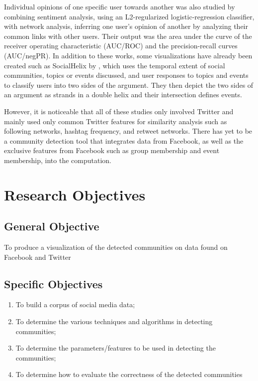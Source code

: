 Individual opinions of one specific user towards another was also studied by  combining sentiment analysis, using an L2-regularized logistic-regression classifier, with network analysis, inferring one user’s opinion of another by analyzing their common links with other users. Their output was the area under the curve of the receiver operating characteristic (AUC/ROC) and the precision-recall curves (AUC/negPR). In addition to these works, some visualizations have already been created such as SocialHelix by , which uses the temporal extent of social communities, topics or events discussed, and user responses to topics and events to classify users into two sides of the argument. They then depict the two sides of an argument as strands in a double helix and their intersection defines events.

However, it is noticeable that all of these studies only involved Twitter and mainly used only common Twitter features for similarity analysis such as following networks, hashtag frequency, and retweet networks. There has yet to be a community detection tool that integrates data from Facebook, as well as the exclusive features from Facebook such as group membership and event membership, into the computation.

\section{Research Objectives}
\label{sec:researchobjectives}

\subsection{General Objective}
\label{sec:generalobjective}

To produce a visualization of the detected communities on data found on Facebook and Twitter

\subsection{Specific Objectives}
\label{sec:specificobjectives}

\begin{enumerate}
	\item To build a corpus of social media data;
	\item To determine the various techniques and algorithms in detecting communities;
	\item To determine the parameters/features to be used in detecting the communities;
	\item To determine how to evaluate the correctness of the detected communities
\end{enumerate}

